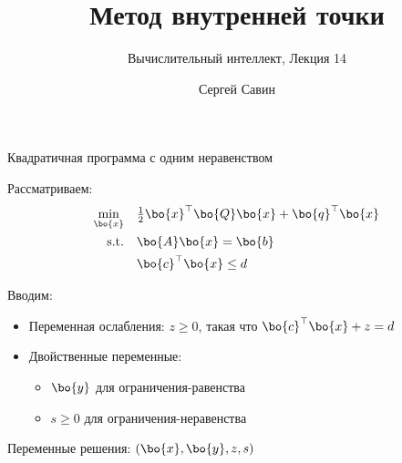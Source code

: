 \documentclass{beamer}
\title{Метод внутренней точки}
\subtitle{Вычислительный интеллект, Лекция  14}
\author{Сергей Савин}
\date{\mydate}
\begin{document}
\maketitle


%
%

\begin{frame}{Квадратичная программа с одним неравенством}
	\begin{flushleft}
		
		Рассматриваем:
		\begin{align*}
			\min_{\bo{x}} \quad & \tfrac{1}{2} \bo{x}^\top \bo{Q} \bo{x} + \bo{q}^\top \bo{x} \\
			\text{s.t.} \quad & \bo{A}\bo{x} = \bo{b} \\
			& \bo{c}^\top \bo{x} \le d
		\end{align*}
		
		\vspace{0.5em}
		
		Вводим:
		\begin{itemize}
			\item Переменная ослабления: $z \ge 0$, такая что $\bo{c}^\top \bo{x} + z = d$
			\item Двойственные переменные:
			\begin{itemize}
				\item $\bo{y}$ для ограничения-равенства
				\item $s \ge 0$ для ограничения-неравенства
			\end{itemize}
		\end{itemize}
		
		\vspace{0.5em}
		
		Переменные решения: $(\bo{x}, \bo{y}, z, s)$
		
	\end{flushleft}
\end{frame}
\end{document}
